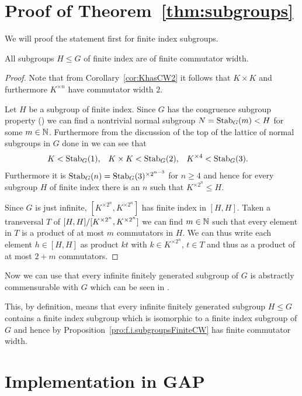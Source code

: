 \documentclass[a4paper,11pt]{amsart}
\begin{document}
\section{Proof of Theorem~\ref{thm:subgroups}}
We will proof the statement first for finite index subgroups. 
\begin{pro}\label{pro:f.i.subgroupsFiniteCW}
  All subgroups $H \leq G$ of finite index are of finite commutator width.
\end{pro}
\begin{proof}
 Note that from Corollary~\ref{cor:KhasCW2} it follows that $K\times K$ and furthermore 
 $K^{\times n}$ have commutator width $2$. 
 
 Let $H$ be a subgroup of finite index. Since $G$ has the congruence subgroup property
 (\cite{Bartholdi:parabolicSubgroups}) we can find a nontrivial normal subgroup $N=\operatorname{Stab}_G(m)<H$
 for some $m\in\mathbb{N}$. Furthermore from the discussion of the top of the lattice of normal subgroups
 in $G$ done in \cite{Bartholdi:parabolicSubgroups} we can see that 
 \begin{align*}
  K&<\operatorname{Stab}_G(1), & K\times K&<\operatorname{Stab}_G(2), & K^{\times 4}&<\operatorname{Stab}_G(3).
 \end{align*}
 Furthermore it is $\operatorname{Stab}_G(n)=\operatorname{Stab}_G(3)^{\times 2^{n-3}}$ for $n\geq 4$ and hence for every 
 subgroup $H$ of finite index there is an $n$ such that $K^{\times 2^n}\leq H$.
  
  Since $G$ is just infinite, $[K^{\times2^n},K^{\times2^n}]$ has finite index in $[H,H]$.
  Taken a transversal $T$ of ${[H,H]/[K^{\times2^n},K^{\times2^n}]}$ we can find 
  $m\in \mathbb{N}$ such that every element in $T$ is a product of at most $m$ commutators in $H$.
  We can thus write each element $h\in [H,H]$ as product $kt$ with $k\in K^{\times 2^n}$, 
  $t\in T$ and thus as a product of at most $2+m$ commutators.  
\end{proof}
Now we can use that every infinite finitely generated subgroup of $G$ is 
abstractly commensurable with $G$ which can be seen in 
\cite[Theorem~1]{Grigorchuk-Wilson:Commensurability}.

This, by definition, means that every infinite finitely generated subgroup $H\leq G$ 
contains a finite index subgroup which is isomorphic to a finite index subgroup
of $G$ and hence by Proposition~\ref{pro:f.i.subgroupsFiniteCW} has finite
commutator width. 

\section{Implementation in GAP}
\end{document}
